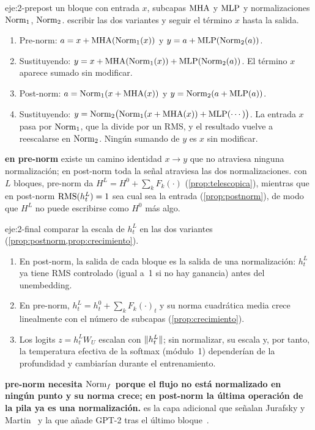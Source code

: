 \begin{solucion}{eje:2-prepost}
\datos un bloque con entrada $x$, subcapas $\operatorname{MHA}$ y $\operatorname{MLP}$ y normalizaciones $\operatorname{Norm}_1$, $\operatorname{Norm}_2$.
\planteamiento escribir las dos variantes y seguir el término $x$ hasta la salida.
\pasos
\begin{enumerate}[label=\arabic*.]
  \item Pre-norm: $a=x+\operatorname{MHA}(\operatorname{Norm}_1(x))$ y $y=a+\operatorname{MLP}(\operatorname{Norm}_2(a))$.
  \item Sustituyendo: $y=x+\operatorname{MHA}(\operatorname{Norm}_1(x))+\operatorname{MLP}(\operatorname{Norm}_2(a))$. El término $x$ aparece sumado sin modificar.
  \item Post-norm: $a=\operatorname{Norm}_1(x+\operatorname{MHA}(x))$ y $y=\operatorname{Norm}_2(a+\operatorname{MLP}(a))$.
  \item Sustituyendo: $y=\operatorname{Norm}_2\bigl(\operatorname{Norm}_1(x+\operatorname{MHA}(x))+\operatorname{MLP}(\cdots)\bigr)$. La entrada $x$ pasa por $\operatorname{Norm}_1$, que la divide por un RMS, y el resultado vuelve a reescalarse en $\operatorname{Norm}_2$. Ningún sumando de $y$ es $x$ sin modificar.
\end{enumerate}
\resultado \textbf{en pre-norm} existe un camino identidad $x\to y$ que no atraviesa ninguna normalización; en post-norm toda la señal atraviesa las dos normalizaciones.
\comprobacion con $L$ bloques, pre-norm da $H^{L}=H^{0}+\sum_k F_k(\cdot)$ (\cref{prop:telescopica}), mientras que en post-norm $\operatorname{RMS}(h^{L}_t)=1$ sea cual sea la entrada (\cref{prop:postnorm}), de modo que $H^{L}$ no puede escribirse como $H^{0}$ más algo.
\end{solucion}

\begin{solucion}{eje:2-final}
\planteamiento comparar la escala de $h^{L}_t$ en las dos variantes (\cref{prop:postnorm,prop:crecimiento}).
\pasos
\begin{enumerate}[label=\arabic*.]
  \item En post-norm, la salida de cada bloque es la salida de una normalización: $h^{L}_t$ ya tiene RMS controlado (igual a~1 si no hay ganancia) antes del unembedding.
  \item En pre-norm, $h^{L}_t=h^{0}_t+\sum_k F_k(\cdot)_t$ y su norma cuadrática media crece linealmente con el número de subcapas (\cref{prop:crecimiento}).
  \item Los logits $z=h^{L}_tW_U$ escalan con $\lVert h^{L}_t\rVert$; sin normalizar, su escala y, por tanto, la temperatura efectiva de la softmax (módulo~1) dependerían de la profundidad y cambiarían durante el entrenamiento.
\end{enumerate}
\resultado \textbf{pre-norm necesita $\operatorname{Norm}_f$ porque el flujo no está normalizado en ningún punto y su norma crece; en post-norm la última operación de la pila ya es una normalización.}
\comprobacion es la capa adicional que señalan Jurafsky y Martin~\cite[§7.2.3]{jm3} y la que añade GPT-2 tras el último bloque~\cite[§2.3]{gpt2}.
\end{solucion}

